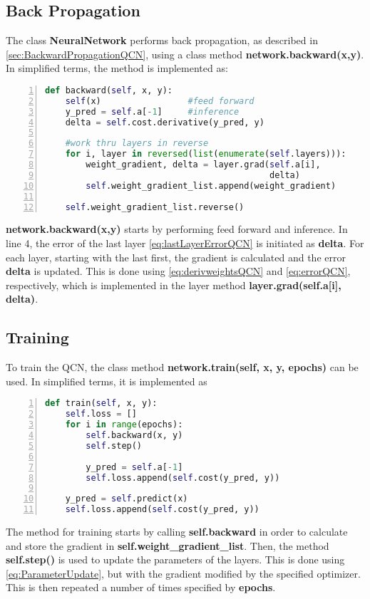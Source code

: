 \subsection{Back Propagation}\label{sec:BackpropImplementation}

The class \textbf{NeuralNetwork} performs back propagation, as described in \autoref{sec:BackwardPropagationQCN}, using a class method \textbf{network.backward(x,y)}. In simplified terms, the method is implemented as:
\begin{lstlisting}[language=python, numbers=left]
def backward(self, x, y):
    self(x)                 #feed forward      
    y_pred = self.a[-1]     #inference
    delta = self.cost.derivative(y_pred, y)

    #work thru layers in reverse
    for i, layer in reversed(list(enumerate(self.layers))):
        weight_gradient, delta = layer.grad(self.a[i], 
                                            delta)
        self.weight_gradient_list.append(weight_gradient)

    self.weight_gradient_list.reverse()
\end{lstlisting}
\textbf{network.backward(x,y)} starts by performing feed forward and inference. In line 4, the error of the last layer \autoref{eq:lastLayerErrorQCN} is initiated as \textbf{delta}. For each layer, starting with the last first, the gradient is calculated and the error \textbf{delta} is updated. This is done using \autoref{eq:derivweightsQCN} and \autoref{eq:errorQCN}, respectively, which is implemented in the layer method \textbf{layer.grad(self.a[i], delta)}.

\subsection{Training}\label{sec:QCNTraining}
To train the QCN, the class method \textbf{network.train(self, x, y, epochs)} can be used. In simplified terms, it is implemented as

\begin{lstlisting}[language=python, numbers=left]
def train(self, x, y):
    self.loss = []
    for i in range(epochs):
        self.backward(x, y)
        self.step()

        y_pred = self.a[-1]
        self.loss.append(self.cost(y_pred, y))
            
    y_pred = self.predict(x)
    self.loss.append(self.cost(y_pred, y))
\end{lstlisting}
The method for training starts by calling \textbf{self.backward} in order to calculate and store the gradient in \textbf{self.weight\_gradient\_list}. Then, the method \textbf{self.step()} is used to update the parameters of the layers. This is done using \autoref{eq:ParameterUpdate}, but with the gradient modified by the specified optimizer. This is then repeated a number of times specified by \textbf{epochs}.

